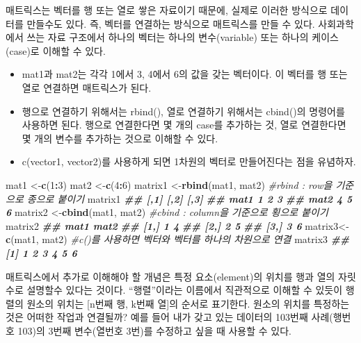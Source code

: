 \documentclass[
]{book}
\newenvironment{Shaded}{\begin{snugshade}}{\end{snugshade}}
\newcommand{\CommentTok}[1]{\textcolor[rgb]{0.56,0.35,0.01}{\textit{#1}}}
\newcommand{\DecValTok}[1]{\textcolor[rgb]{0.00,0.00,0.81}{#1}}
\newcommand{\DocumentationTok}[1]{\textcolor[rgb]{0.56,0.35,0.01}{\textbf{\textit{#1}}}}
\newcommand{\FunctionTok}[1]{\textcolor[rgb]{0.13,0.29,0.53}{\textbf{#1}}}
\newcommand{\NormalTok}[1]{#1}
\newcommand{\OtherTok}[1]{\textcolor[rgb]{0.56,0.35,0.01}{#1}}
\newcommand{\SpecialCharTok}[1]{\textcolor[rgb]{0.81,0.36,0.00}{\textbf{#1}}}
\providecommand{\tightlist}{%
  \setlength{\itemsep}{0pt}\setlength{\parskip}{0pt}}
\begin{document}
매트릭스는 벡터를 행 또는 열로 쌓은 자료이기 때문에, 실제로 이러한 방식으로 데이터를 만들수도 있다. 즉, 벡터를 연결하는 방식으로 매트릭스를 만들 수 있다. 사회과학에서 쓰는 자료 구조에서 하나의 벡터는 하나의 변수(variable) 또는 하나의 케이스(case)로 이해할 수 있다.

\begin{itemize}
\tightlist
\item
  mat1과 mat2는 각각 1에서 3, 4에서 6의 값을 갖는 벡터이다. 이 벡터를 행 또는 열로 연결하면 매트릭스가 된다.
\item
  행으로 연결하기 위해서는 rbind(), 열로 연결하기 위해서는 cbind()의 명령어를 사용하면 된다. 행으로 연결한다면 몇 개의 case를 추가하는 것, 열로 연결한다면 몇 개의 변수를 추가하는 것으로 이해할 수 있다.
\item
  c(vector1, vector2)를 사용하게 되면 1차원의 벡터로 만들어진다는 점을 유념하자.
\end{itemize}

\begin{Shaded}
\begin{Highlighting}[]
\NormalTok{mat1 }\OtherTok{\textless{}{-}}\FunctionTok{c}\NormalTok{(}\DecValTok{1}\SpecialCharTok{:}\DecValTok{3}\NormalTok{)}
\NormalTok{mat2 }\OtherTok{\textless{}{-}}\FunctionTok{c}\NormalTok{(}\DecValTok{4}\SpecialCharTok{:}\DecValTok{6}\NormalTok{)}
\NormalTok{matrix1 }\OtherTok{\textless{}{-}}\FunctionTok{rbind}\NormalTok{(mat1, mat2)  }\CommentTok{\#rbind : row을 기준으로 종으로 붙이기}
\NormalTok{matrix1}
\DocumentationTok{\#\#      [,1] [,2] [,3]}
\DocumentationTok{\#\# mat1    1    2    3}
\DocumentationTok{\#\# mat2    4    5    6}
\NormalTok{matrix2 }\OtherTok{\textless{}{-}}\FunctionTok{cbind}\NormalTok{(mat1, mat2)  }\CommentTok{\#cbind : column을 기준으로 횡으로 붙이기}
\NormalTok{matrix2}
\DocumentationTok{\#\#      mat1 mat2}
\DocumentationTok{\#\# [1,]    1    4}
\DocumentationTok{\#\# [2,]    2    5}
\DocumentationTok{\#\# [3,]    3    6}
\NormalTok{matrix3}\OtherTok{\textless{}{-}}\FunctionTok{c}\NormalTok{(mat1, mat2) }\CommentTok{\#c()를 사용하면 벡터와 벡터를 하나의 차원으로 연결}
\NormalTok{matrix3}
\DocumentationTok{\#\# [1] 1 2 3 4 5 6}
\end{Highlighting}
\end{Shaded}

매트릭스에서 추가로 이해해야 할 개념은 특정 요소(element)의 위치를 행과 열의 자릿수로 설명할수 있다는 것이다. ``행렬''이라는 이름에서 직관적으로 이해할 수 있듯이 행렬의 원소의 위치는 {[}n번째 행, k번째 열{]}의 순서로 표기한다. 원소의 위치를 특정하는 것은 어떠한 작업과 연결될까? 예를 들어 내가 갖고 있는 데이터의 103번째 사례(행번호 103)의 3번째 변수(열번호 3번)를 수정하고 싶을 때 사용할 수 있다.
\end{document}
